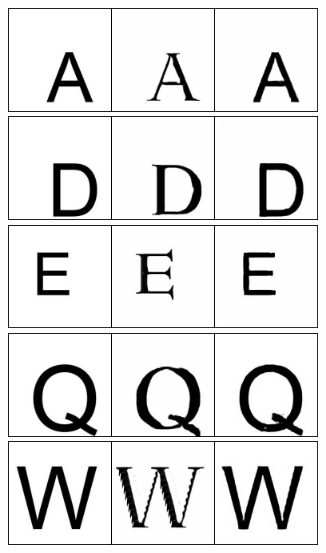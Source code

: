 \documentclass[10pt,twocolumn,letterpaper]{article}
\begin{document}
\begin{figure}[!htb]
     \centering
     \begin{subfigure}[]{0.49\textwidth}
         \centering
         \includegraphics[width=0.9\textwidth]{test_a_2_b_4}\\
         \vspace{0.3cm}
		 \includegraphics[width=0.9\textwidth]{test_a_2_b_32(1)}\\
		 \vspace{0.3cm}
		 \includegraphics[width=0.9\textwidth]{test_a_2_b_40}\\
		 \vspace{0.3cm}
		 \includegraphics[width=0.9\textwidth]{test_a_2_b_145}\\
		 \vspace{0.3cm}
		 \includegraphics[width=0.9\textwidth]{test_a_2_b_206}

\end{subfigure}
\end{figure}
\end{document}
